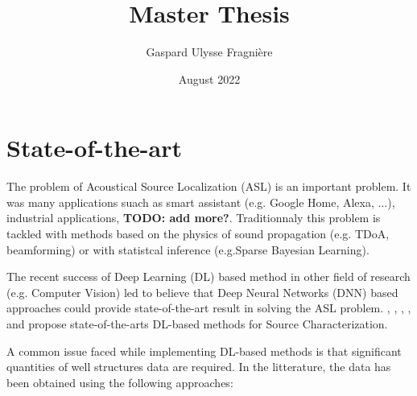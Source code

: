\documentclass{article}
\title{Master Thesis}
\author{Gaspard Ulysse Fragnière}
\date{August 2022}
\begin{document}
\maketitle


\section{State-of-the-art}

The problem of Acoustical Source Localization (ASL) is an important problem. It was many applications suach as smart assistant (e.g. Google Home, Alexa, ...), industrial applications, \textbf{TODO: add more?}. Traditionnaly this problem is tackled with methods based on the physics of sound propagation (e.g. TDoA, beamforming) or with statistcal inference (e.g.Sparse Bayesian Learning). 

The recent success of Deep Learning (DL) based method in other field of research (e.g. Computer Vision) led to believe that Deep Neural Networks (DNN) based approaches could provide state-of-the-art result in solving the ASL problem. \cite{castellini2021neural}, \cite{kujawski2019deep}, \cite{lee2021deep}, \cite{ma2019phased}, \cite{pinto2021deconvoluting} and \cite{xu2021deep} propose state-of-the-arts DL-based methods for Source Characterization. 


A common issue faced while implementing DL-based methods is that significant quantities of well structures data are required. In the litterature, the data has been obtained using the following approaches:
\end{document}
